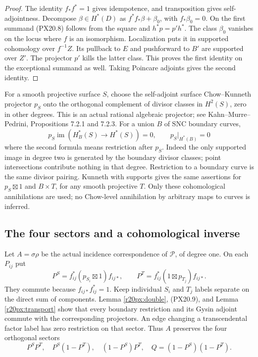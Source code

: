 \begin{proof}
The identity $f_*f^*=1$ gives idempotence, and transposition gives
self-adjointness. Decompose $\beta\in H^*(D)$ as
$f^*f_*\beta+\beta_0$, with $f_*\beta_0=0$. On the first
summand (PX20.8) follows from the square and $h^*p=p'h^*$.
The class $\beta_0$ vanishes on the locus where $f$ is an
isomorphism. Localization puts it in supported cohomology over
$f^{-1}Z$. Its pullback to $E$ and pushforward to $B'$ are
supported over $Z'$. The projector $p'$ kills the latter class.
This proves the first identity on the exceptional summand as well.
Taking Poincare adjoints gives the second identity.
\end{proof}

For a smooth projective surface $S$, choose the self-adjoint
surface Chow--Kunneth projector $p_S$ onto the orthogonal complement
of divisor classes in $H^2(S)$, zero in other degrees. This is an
actual rational algebraic projector; see Kahn--Murre--Pedrini,
Propositions 7.2.1 and 7.2.3. For a union $B$ of SNC boundary curves,
\[
 p_S\operatorname{im}(H_B^*(S)\to H^*(S))=0,
 \qquad p_S|_{H^*(B)}=0
 \tag{PX20.9}
\]
where the second formula means restriction after $p_S$.
Indeed the only supported image in degree two is generated by the
boundary divisor classes; point intersections contribute nothing
in that degree. Restriction to a boundary curve is the same divisor
pairing. Kunneth with supports gives the same assertions for
$p_S\boxtimes1$ and $B\times T$, for any smooth projective $T$.
Only these cohomological annihilations are used; no Chow-level
annihilation by arbitrary maps to curves is inferred.

\subsection{The four sectors and a cohomological inverse}

Let $A=\sigma\rho$ be the actual incidence correspondence of
$\mathcal P$, of degree one. On each $P_{ij}$ put
\[
 P^S=f_{ij}^*(p_{S_i}\boxtimes1)f_{ij*},\qquad
 P^T=f_{ij}^*(1\boxtimes p_{T_j})f_{ij*}.
 \tag{PX20.10}
\]
They commute because $f_{ij*}f_{ij}^*=1$. Keep individual
$S_i$ and $T_j$ labels separate on the direct sum of components.
Lemma \ref{r20px:double}, (PX20.9), and
Lemma \ref{r20px:transport} show that every boundary restriction
and its Gysin adjoint commute with the corresponding projectors.
An edge changing a transcendental factor label has zero restriction
on that sector. Thus $A$ preserves the four orthogonal sectors
\[
 P^SP^T,\quad P^S(1-P^T),\quad(1-P^S)P^T,\quad
 Q=(1-P^S)(1-P^T).
 \tag{PX20.11}
\]

